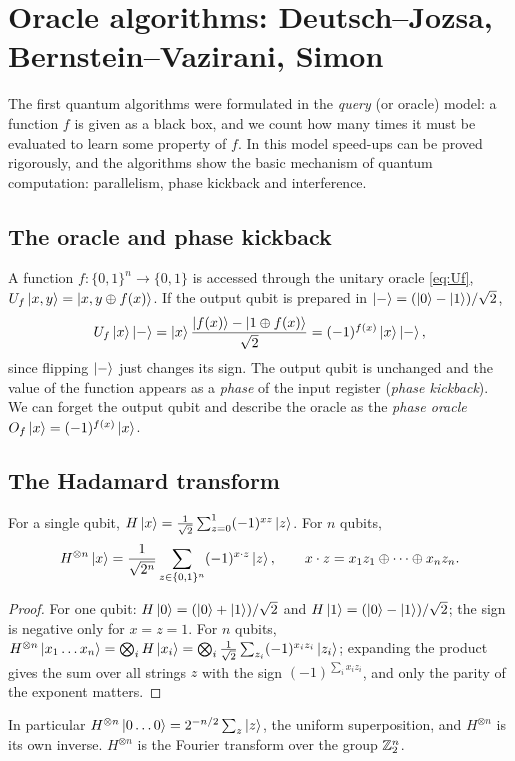 \chapter[Oracle algorithms]{Oracle algorithms: Deutsch--Jozsa, Bernstein--Vazirani, Simon}\label{ch:dj}

The first quantum algorithms were formulated in the \emph{query} (or oracle) model: a function $f$ is given as a black box, and we count how many times it must be evaluated to learn some
property of $f$. In this model speed-ups can be proved rigorously, and the algorithms show the basic mechanism of quantum computation: parallelism, phase kickback and interference.

\section{The oracle and phase kickback}
A function $f:\{0,1\}^n\to\{0,1\}$ is accessed through the unitary oracle \cref{eq:Uf}, $U_f\left|x,y\right\rangle=\left|x,y\oplus f(x)\right\rangle$. If the output qubit is prepared in $\left|-\right\rangle=(\left|0\right\rangle-\left|1\right\rangle)/\sqrt2$,
\begin{equation}\label{eq:kickback}
  U_f\left|x\right\rangle\left|-\right\rangle=\left|x\right\rangle\frac{\left|f(x)\right\rangle-\left|1\oplus f(x)\right\rangle}{\sqrt2}=(-1)^{f(x)}\left|x\right\rangle\left|-\right\rangle,
\end{equation}
since flipping $\left|-\right\rangle$ just changes its sign. The output qubit is unchanged and the value of the function appears as a \emph{phase} of the input register (\emph{phase kickback}). We can forget
the output qubit and describe the oracle as the \emph{phase oracle} $O_f\left|x\right\rangle=(-1)^{f(x)}\left|x\right\rangle$.

\section{The Hadamard transform}
\begin{lemma}\label{lem:hadamard}
For a single qubit, $H\left|x\right\rangle=\frac1{\sqrt2}\sum_{z=0}^1(-1)^{xz}\left|z\right\rangle$. For $n$ qubits,
\begin{equation}\label{eq:Hn}
  H^{\otimes n}\left|x\right\rangle=\frac1{\sqrt{2^n}}\sum_{z\in\{0,1\}^n}(-1)^{x\cdot z}\left|z\right\rangle,\qquad x\cdot z=x_1z_1\oplus\dots\oplus x_nz_n.
\end{equation}
\end{lemma}
\begin{proof}
For one qubit: $H\left|0\right\rangle=(\left|0\right\rangle+\left|1\right\rangle)/\sqrt2$ and $H\left|1\right\rangle=(\left|0\right\rangle-\left|1\right\rangle)/\sqrt2$; the sign is negative only for $x=z=1$. For $n$ qubits, $H^{\otimes n}\left|x_1\dots x_n\right\rangle=\bigotimes_iH\left|x_i\right\rangle
=\bigotimes_i\frac1{\sqrt2}\sum_{z_i}(-1)^{x_iz_i}\left|z_i\right\rangle$; expanding the product gives the sum over all strings $z$ with the sign $(-1)^{\sum_ix_iz_i}$, and only the parity of the exponent matters.
\end{proof}
In particular $H^{\otimes n}\left|0\dots0\right\rangle=2^{-n/2}\sum_z\left|z\right\rangle$, the uniform superposition, and $H^{\otimes n}$ is its own inverse. $H^{\otimes n}$ is the Fourier transform over the group $\mathbb Z_2^n$.

